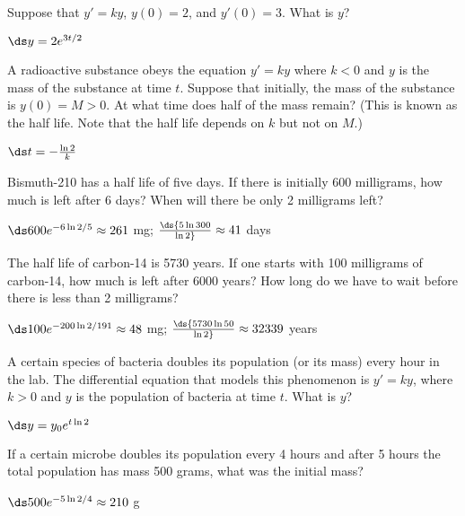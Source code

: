 \begin{enumialphparenastyle}
\begin{ex}
 Suppose that $y' = ky$, $y(0)=2$, and $y'(0)=3$. 
What is $y$?
\begin{sol}
 $\ds y=2e^{3t/2}$
\end{sol}
\end{ex}


\begin{ex}
 A radioactive substance obeys the equation
$y' =ky$ where $k< 0 $ and $y$ is the mass of the
substance at time $t$. Suppose that initially, the mass of the
substance is $y(0)=M>0$. At what time does half of the mass remain?
(This is known as the half life. Note that the half life depends on
$k$ but not on $M$.)
\begin{sol}
 $\ds t=-{\ln 2\over k}$
\end{sol}
\end{ex}


\begin{ex}
 Bismuth-210 has a half life of five days. If there is
initially 600 milligrams, how much is left after 6 days? When will
there be only 2 milligrams left?
\begin{sol}
 $\ds 600e^{-6\ln 2/5}\approx 261$ mg; $\ds {5\ln
  300\over\ln2}\approx 41$ days
\end{sol}
\end{ex}


\begin{ex}
 The half life of carbon-14 is 5730 years. If one starts
with 100 milligrams of carbon-14, how much is left after 6000
years? How long do we have to wait before there is less than 2
milligrams?
\begin{sol}
 $\ds 100e^{-200\ln 2/191}\approx 48$ mg; $\ds {5730\ln
  50\over\ln2}\approx 32339$ years
\end{sol}
\end{ex}


\begin{ex}
 A certain species of bacteria doubles its population
(or its mass)
every hour in the lab. 
The differential equation that models this phenomenon
is $y' =ky$, where $k>0 $ and $y$
is the population of bacteria at time $t$. What is $y$?
\begin{sol}
 $\ds y=y_0e^{t\ln 2}$
\end{sol}
\end{ex}


\begin{ex}
 If a certain microbe doubles its population every 4
hours and after 5 hours the total population has mass 500 grams,
what was the initial mass?
\begin{sol}
 $\ds 500e^{-5\ln2/4}\approx 210$ g
\end{sol}
\end{ex}

\end{enumialphparenastyle}